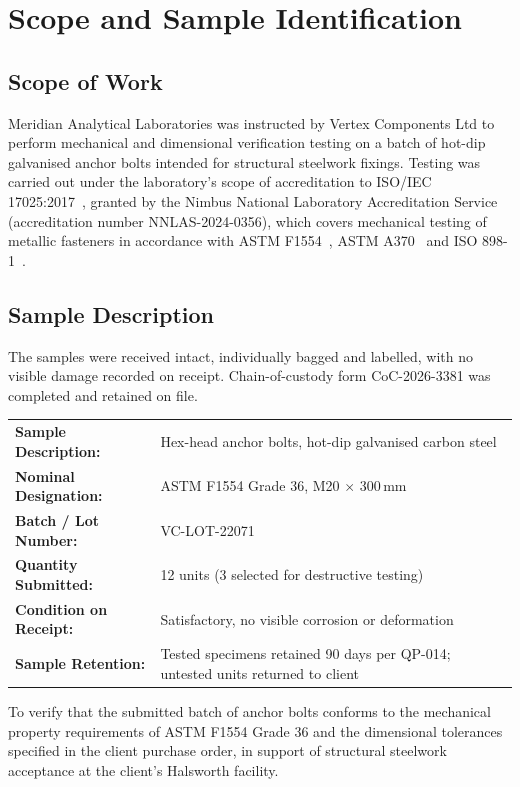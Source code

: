 \section{Scope and Sample Identification}

\subsection{Scope of Work}
Meridian Analytical Laboratories was instructed by Vertex Components Ltd to perform mechanical
and dimensional verification testing on a batch of hot-dip galvanised anchor bolts intended for
structural steelwork fixings. Testing was carried out under the laboratory's scope of
accreditation to ISO/IEC 17025:2017~\cite{iso17025}, granted by the Nimbus National Laboratory
Accreditation Service (accreditation number NNLAS-2024-0356), which covers mechanical testing of
metallic fasteners in accordance with ASTM F1554~\cite{astmf1554}, ASTM A370~\cite{astma370} and
ISO 898-1~\cite{iso898}.

\subsection{Sample Description}
The samples were received intact, individually bagged and labelled, with no visible damage
recorded on receipt. Chain-of-custody form CoC-2026-3381 was completed and retained on file.

\begin{tabularx}{\linewidth}{@{}p{4.7cm}X@{}}
\textbf{\color{labnavy}Sample Description:} & Hex-head anchor bolts, hot-dip galvanised carbon steel \\
\textbf{\color{labnavy}Nominal Designation:} & ASTM F1554 Grade 36, M20 $\times$ 300\,mm \\
\textbf{\color{labnavy}Batch / Lot Number:} & VC-LOT-22071 \\
\textbf{\color{labnavy}Quantity Submitted:} & 12 units (3 selected for destructive testing) \\
\textbf{\color{labnavy}Condition on Receipt:} & Satisfactory, no visible corrosion or deformation \\
\textbf{\color{labnavy}Sample Retention:} & Tested specimens retained 90 days per QP-014; untested units returned to client \\
\end{tabularx}

\begin{tcolorbox}[infobox,title=Purpose of Testing]
\small
To verify that the submitted batch of anchor bolts conforms to the mechanical property
requirements of ASTM F1554 Grade 36 and the dimensional tolerances specified in the client
purchase order, in support of structural steelwork acceptance at the client's Halsworth facility.
\end{tcolorbox}
